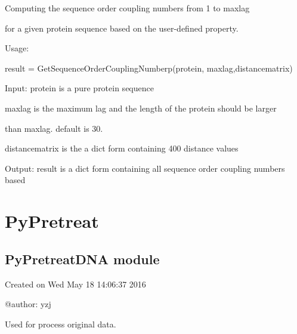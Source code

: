 \documentclass[letterpaper,10pt,english]{sphinxmanual}
\begin{document}
\begin{fulllineitems}
\label{reference/QuasiSequenceOrder:QuasiSequenceOrder.GetSequenceOrderCouplingNumberp}
Computing the sequence order coupling numbers from 1 to maxlag

for a given protein sequence based on the user-defined property.

Usage:

result = GetSequenceOrderCouplingNumberp(protein, maxlag,distancematrix)

Input: protein is a pure protein sequence

maxlag is the maximum lag and the length of the protein should be larger

than maxlag. default is 30.

distancematrix is the a dict form containing 400 distance values

Output: result is a dict form containing all sequence order coupling numbers based

\end{fulllineitems}



\section{PyPretreat}
\label{reference/PyPretreat::doc}\label{reference/PyPretreat:pypretreat}

\subsection{PyPretreatDNA module}
\label{reference/PyPretreatDNA:module-PyPretreatDNA}\label{reference/PyPretreatDNA:pypretreatdna-module}\label{reference/PyPretreatDNA::doc}
Created on Wed May 18 14:06:37 2016

@author: yzj

\begin{fulllineitems}
\label{reference/PyPretreatDNA:PyPretreatDNA.ALPHABET}
Used for process original data.

\end{fulllineitems}

\end{document}
